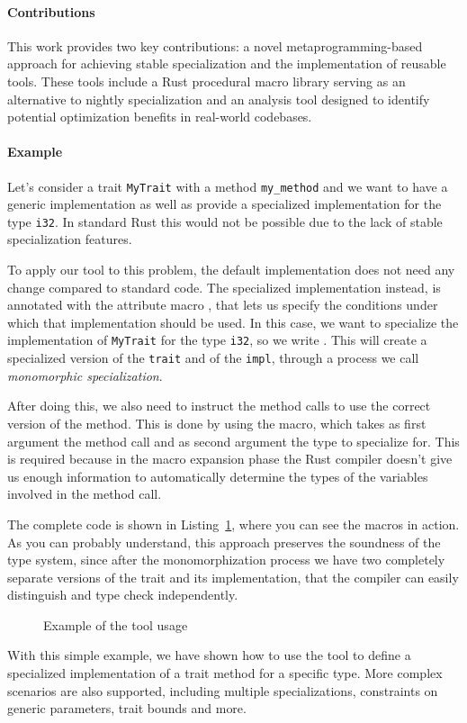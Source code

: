 \paragraph{Contributions}
This work provides two key contributions: a novel metaprogramming-based approach for achieving stable specialization and the implementation of reusable tools.
These tools include a Rust procedural macro library serving as an alternative to nightly specialization and an analysis tool designed to identify potential optimization benefits in real-world codebases.

\paragraph{Example}
Let's consider a trait \texttt{MyTrait} with a method \texttt{my\_method} and we want to have a generic implementation as well as provide a specialized implementation for the type \texttt{i32}.
In standard Rust this would not be possible due to the lack of stable specialization features.

To apply our tool to this problem, the default implementation does not need any change compared to standard code.
The specialized implementation instead, is annotated with the attribute macro \inlinerust{#[when(...)]}, that lets us specify the conditions under which that implementation should be used.
In this case, we want to specialize the implementation of \texttt{MyTrait} for the type \texttt{i32}, so we write \inlinerust{#[when(T = i32)]}.
This will create a specialized version of the \texttt{trait} and of the \texttt{impl}, through a process we call \textit{monomorphic specialization}.

After doing this, we also need to instruct the method calls to use the correct version of the method.
This is done by using the  macro, which takes as first argument the method call and as second argument the type to specialize for.
This is required because in the macro expansion phase the Rust compiler doesn't give us enough information to automatically determine the types of the variables involved in the method call.

The complete code is shown in Listing~\ref{fig:monomorphic_specialization_pre}, where you can see the macros in action.
As you can probably understand, this approach preserves the soundness of the type system, since after the monomorphization process we have two completely separate versions of the trait and its implementation, that the compiler can easily distinguish and type check independently.

\begin{figure}[htbp!]
	\centering
	\captionsetup{type=listing,skip=2pt}
	\caption{Example of the tool usage}
	\label{fig:monomorphic_specialization_pre}
\end{figure}

With this simple example, we have shown how to use the tool to define a specialized implementation of a trait method for a specific type.
More complex scenarios are also supported, including multiple specializations, constraints on generic parameters, trait bounds and more.